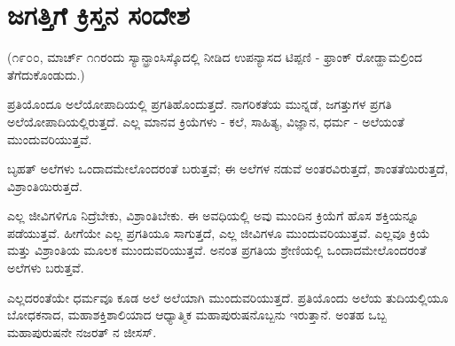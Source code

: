 
\chapter{ಜಗತ್ತಿಗೆ ಕ್ರಿಸ್ತನ ಸಂದೇಶ}

(೧೯೦೦, ಮಾರ್ಚ್ ೧೧ರಂದು ಸ್ಯಾನ್ಫ್ರಾಂಸಿಸ್ಕೊದಲ್ಲಿ ನೀಡಿದ ಉಪನ್ಯಾಸದ ಟಿಪ್ಪಣಿ - ಫ್ರಾಂಕ್ ರೋಡ್ಹಾಮಲ್ರಿಂದ ತೆಗೆದುಕೊಂಡುದು.)

ಪ್ರತಿಯೊಂದೂ ಅಲೆಯೋಪಾದಿಯಲ್ಲಿ ಪ್ರಗತಿಹೊಂದುತ್ತದೆ. ನಾಗರಿಕತೆಯ ಮುನ್ನಡೆ, ಜಗತ್ತುಗಳ ಪ್ರಗತಿ ಅಲೆಯೋಪಾದಿಯಲ್ಲಿರುತ್ತದೆ. ಎಲ್ಲ ಮಾನವ ಕ್ರಿಯೆಗಳು - ಕಲೆ, ಸಾಹಿತ್ಯ, ವಿಜ್ಞಾನ, ಧರ್ಮ - ಅಲೆಯಂತೆ ಮುಂದುವರಿಯುತ್ತವೆ.

ಬೃಹತ್ ಅಲೆಗಳು ಒಂದಾದಮೇಲೊಂದರಂತೆ ಬರುತ್ತವೆ; ಈ ಅಲೆಗಳ ನಡುವೆ ಅಂತರವಿರುತ್ತದೆ, ಶಾಂತತೆಯಿರುತ್ತದೆ, ವಿಶ್ರಾಂತಿಯಿರುತ್ತದೆ.

ಎಲ್ಲ ಜೀವಿಗಳಿಗೂ ನಿದ್ರೆಬೇಕು, ವಿಶ್ರಾಂತಿಬೇಕು. ಈ ಅವಧಿಯಲ್ಲಿ ಅವು ಮುಂದಿನ ಕ್ರಿಯೆಗೆ ಹೊಸ ಶಕ್ತಿಯನ್ನೂ ಪಡೆಯುತ್ತವೆ. ಹೀಗೆಯೇ ಎಲ್ಲ ಪ್ರಗತಿಯೂ ಸಾಗುತ್ತದೆ, ಎಲ್ಲ ಜೀವಿಗಳೂ ಮುಂದುವರಿಯುತ್ತವೆ. ಎಲ್ಲವೂ ಕ್ರಿಯೆ ಮತ್ತು ವಿಶ್ರಾಂತಿಯ ಮೂಲಕ ಮುಂದುವರಿಯುತ್ತವೆ. ಅನಂತ ಪ್ರಗತಿಯ ಶ್ರೇಣಿಯಲ್ಲಿ ಒಂದಾದಮೇಲೊಂದರಂತೆ ಅಲೆಗಳು ಬರುತ್ತವೆ.

ಎಲ್ಲದರಂತೆಯೇ ಧರ್ಮವೂ ಕೂಡ ಅಲೆ ಅಲೆಯಾಗಿ ಮುಂದುವರಿಯುತ್ತದೆ. ಪ್ರತಿಯೊಂದು ಅಲೆಯ ತುದಿಯಲ್ಲಿಯೂ ಬೋಧಕನಾದ, ಮಹಾಶಕ್ತಿಶಾಲಿಯಾದ ಆಧ್ಯಾತ್ಮಿಕ ಮಹಾಪುರುಷನೊಬ್ಬನು ಇರುತ್ತಾನೆ. ಅಂತಹ ಒಬ್ಬ ಮಹಾಪುರುಷನೇ ನಜರತ್ ನ ಜೀಸಸ್.

